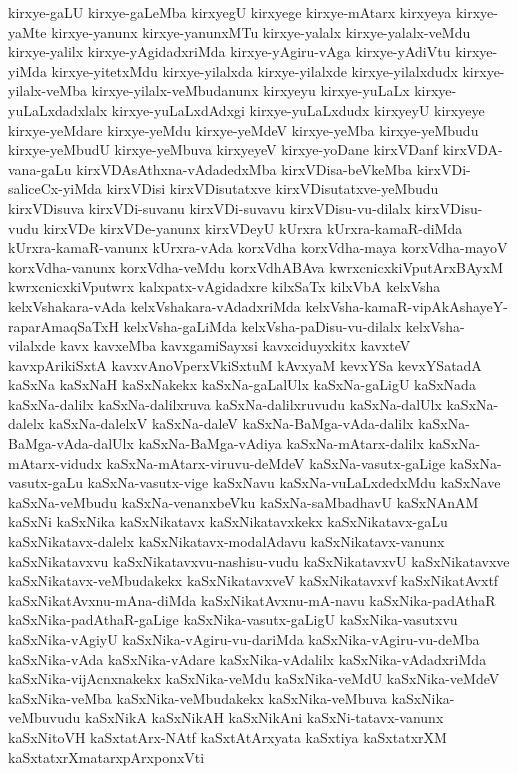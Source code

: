 {kirxye-gaLU
kirxye-gaLeMba
kirxyegU
kirxyege
kirxye-mAtarx
kirxyeya
kirxye-yaMte
kirxye-yanunx
kirxye-yanunxMTu
kirxye-yalalx
kirxye-yalalx-veMdu
kirxye-yalilx
kirxye-yAgidadxriMda
kirxye-yAgiru-vAga
kirxye-yAdiVtu
kirxye-yiMda
kirxye-yitetxMdu
kirxye-yilalxda
kirxye-yilalxde
kirxye-yilalxdudx
kirxye-yilalx-veMba
kirxye-yilalx-veMbudanunx
kirxyeyu
kirxye-yuLaLx
kirxye-yuLaLxdadxlalx
kirxye-yuLaLxdAdxgi
kirxye-yuLaLxdudx
kirxyeyU
kirxyeye
kirxye-yeMdare
kirxye-yeMdu
kirxye-yeMdeV
kirxye-yeMba
kirxye-yeMbudu
kirxye-yeMbudU
kirxye-yeMbuva
kirxyeyeV
kirxye-yoDane
kirxVDanf
kirxVDA-vana-gaLu
kirxVDAsAthxna-vAdadedxMba
kirxVDisa-beVkeMba
kirxVDi-saliceCx-yiMda
kirxVDisi
kirxVDisutatxve
kirxVDisutatxve-yeMbudu
kirxVDisuva
kirxVDi-suvanu
kirxVDi-suvavu
kirxVDisu-vu-dilalx
kirxVDisu-vudu
kirxVDe
kirxVDe-yanunx
kirxVDeyU
kUrxra
kUrxra-kamaR-diMda
kUrxra-kamaR-vanunx
kUrxra-vAda
korxVdha
korxVdha-maya
korxVdha-mayoV
korxVdha-vanunx
korxVdha-veMdu
korxVdhABAva
kwrxcnicxkiVputArxBAyxM
kwrxcnicxkiVputwrx
kalxpatx-vAgidadxre
kilxSaTx
kilxVbA
kelxVsha
kelxVshakara-vAda
kelxVshakara-vAdadxriMda
kelxVsha-kamaR-vipAkAshayeY-raparAmaqSaTxH
kelxVsha-gaLiMda
kelxVsha-paDisu-vu-dilalx
kelxVsha-vilalxde
kavx
kavxeMba
kavxgamiSayxsi
kavxciduyxkitx
kavxteV
kavxpArikiSxtA
kavxvAnoVperxVkiSxtuM
kAvxyaM
kevxYSa
kevxYSatadA
kaSxNa
kaSxNaH
kaSxNakekx
kaSxNa-gaLalUlx
kaSxNa-gaLigU
kaSxNada
kaSxNa-dalilx
kaSxNa-dalilxruva
kaSxNa-dalilxruvudu
kaSxNa-dalUlx
kaSxNa-dalelx
kaSxNa-dalelxV
kaSxNa-daleV
kaSxNa-BaMga-vAda-dalilx
kaSxNa-BaMga-vAda-dalUlx
kaSxNa-BaMga-vAdiya
kaSxNa-mAtarx-dalilx
kaSxNa-mAtarx-vidudx
kaSxNa-mAtarx-viruvu-deMdeV
kaSxNa-vasutx-gaLige
kaSxNa-vasutx-gaLu
kaSxNa-vasutx-vige
kaSxNavu
kaSxNa-vuLaLxdedxMdu
kaSxNave
kaSxNa-veMbudu
kaSxNa-venanxbeVku
kaSxNa-saMbadhavU
kaSxNAnAM
kaSxNi
kaSxNika
kaSxNikatavx
kaSxNikatavxkekx
kaSxNikatavx-gaLu
kaSxNikatavx-dalelx
kaSxNikatavx-modalAdavu
kaSxNikatavx-vanunx
kaSxNikatavxvu
kaSxNikatavxvu-nashisu-vudu
kaSxNikatavxvU
kaSxNikatavxve
kaSxNikatavx-veMbudakekx
kaSxNikatavxveV
kaSxNikatavxvf
kaSxNikatAvxtf
kaSxNikatAvxnu-mAna-diMda
kaSxNikatAvxnu-mA-navu
kaSxNika-padAthaR
kaSxNika-padAthaR-gaLige
kaSxNika-vasutx-gaLigU
kaSxNika-vasutxvu
kaSxNika-vAgiyU
kaSxNika-vAgiru-vu-dariMda
kaSxNika-vAgiru-vu-deMba
kaSxNika-vAda
kaSxNika-vAdare
kaSxNika-vAdalilx
kaSxNika-vAdadxriMda
kaSxNika-vijAcnxnakekx
kaSxNika-veMdu
kaSxNika-veMdU
kaSxNika-veMdeV
kaSxNika-veMba
kaSxNika-veMbudakekx
kaSxNika-veMbuva
kaSxNika-veMbuvudu
kaSxNikA
kaSxNikAH
kaSxNikAni
kaSxNi-tatavx-vanunx
kaSxNitoVH
kaSxtatArx-NAtf
kaSxtAtArxyata
kaSxtiya
kaSxtatxrXM
kaSxtatxrXmatarxpArxponxVti
}
